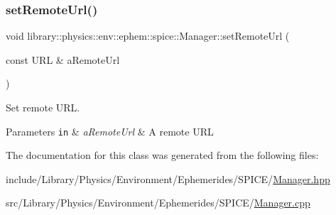 \subsubsection{\texorpdfstring{set\+Remote\+Url()}{setRemoteUrl()}}
{\footnotesize\ttfamily void library\+::physics\+::env\+::ephem\+::spice\+::\+Manager\+::set\+Remote\+Url (\begin{DoxyParamCaption}\item[{const U\+RL \&}]{a\+Remote\+Url }\end{DoxyParamCaption})}



Set remote U\+RL. 


\begin{DoxyParams}[1]{Parameters}
\mbox{\tt in}  & {\em a\+Remote\+Url} & A remote U\+RL \\
\hline
\end{DoxyParams}


The documentation for this class was generated from the following files\+:\begin{DoxyCompactItemize}
\item 
include/\+Library/\+Physics/\+Environment/\+Ephemerides/\+S\+P\+I\+C\+E/\hyperlink{_environment_2_ephemerides_2_s_p_i_c_e_2_manager_8hpp}{Manager.\+hpp}\item 
src/\+Library/\+Physics/\+Environment/\+Ephemerides/\+S\+P\+I\+C\+E/\hyperlink{_environment_2_ephemerides_2_s_p_i_c_e_2_manager_8cpp}{Manager.\+cpp}\end{DoxyCompactItemize}
